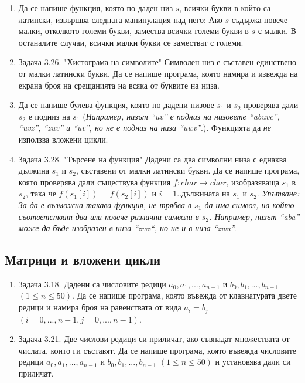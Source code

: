 {\begin{enumerate}[resume]
  \item Да се напише функция, която по даден низ $s$, всички букви в който са латински, извършва следната манипулация над него: Ако $s$ съдържа повече малки, отколкото големи букви, замества всички големи букви в $s$ с малки. В останалите случаи, всички малки букви се заместват с големи.

	\item Задача 3.26. "Хистограма на символите" \cite{sbornik} Символен низ е съставен единствено от малки латински букви. Да се напише програма, която намира и извежда на екрана броя на срещанията на всяка от буквите на низа.

  \item Да се напише булева функция, която по дадени низове $s_1$ и $s_2$ проверява дали $s_2$ е подниз на $s_1$ (\textit{Например, низът ``uv'' е подниз на низовете ``abuvc'', ``uvz'', ``zuv'' и ``uv'', но не е подниз на низа ``uwv''}.). Функцията да \emph{не} използва вложени цикли.

  \item Задача 3.28. "Търсене на функция" \cite{sbornik} Дадени са два символни низа с еднаква дължина $s_1$ и $s_2$, съставени от малки латински букви. Да се напише програма, която проверява дали съществува функция $f:char \rightarrow char$, изобразяваща $s_1$ в $s_2$, така че $f(s_1[i])$ = $f(s_2[i])$ и $i=1..$дължината на $s_1$ и $s_2$. \textit{Упътване: За да е възможна такава функция, не трябва в $s_1$ да има символ, на който съответстват два или повече различни символи в $s_2$. Например, низът ``aba'' може да бъде изобразен в низа ``zwz``, но не и в низа ``zwu''.}

\end{enumerate}


\pagebreak

\subsection {Матрици и вложени цикли}

\begin{enumerate}[resume]

	\item Задача 3.18. \cite{sbornik} Дадени са числовите редици $a_0, a_1, ..., a_{n-1}$ и $b_0, b_1, ..., b_{n-1}$ $(1 \leq n \leq 50)$. Да се напише програма, която въвежда от клавиатурата двете редици и намира броя на равенствата от вида $a_i = b_j$ $(i = 0, ..., n-1, j = 0, ..., n-1)$.

	\item Задача 3.21. \cite{sbornik} Две числови редици си приличат, ако съвпадат множествата от числата, които ги съставят. Да се напише програма, която въвежда числовите редици $a_0, a_1, ..., a_{n-1}$ и $b_0, b_1, ..., b_{n-1}$ $(1 \leq n \leq 50)$ и установява дали си приличат.


\end{enumerate}}
